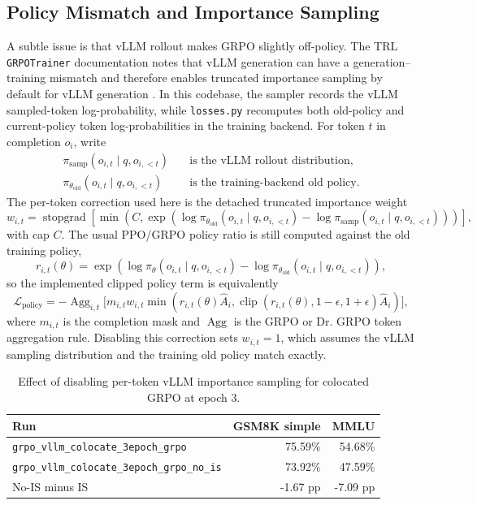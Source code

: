 \documentclass[11pt]{article}
\begin{document}
\subsection{Policy Mismatch and Importance Sampling}
A subtle issue is that vLLM rollout makes GRPO slightly off-policy. The TRL \texttt{GRPOTrainer} documentation notes that vLLM generation can have a generation--training mismatch and therefore enables truncated importance sampling by default for vLLM generation \cite{trl_grpo_trainer_doc}. In this codebase, the sampler records the vLLM sampled-token log-probability, while \texttt{losses.py} recomputes both old-policy and current-policy token log-probabilities in the training backend. For token $t$ in completion $o_i$, write
\[
\begin{aligned}
\pi_{\mathrm{samp}}(o_{i,t}\mid q,o_{i,<t})
&\quad\text{is the vLLM rollout distribution,} \\
\pi_{\theta_{\mathrm{old}}}(o_{i,t}\mid q,o_{i,<t})
&\quad\text{is the training-backend old policy.}
\end{aligned}
\]
The per-token correction used here is the detached truncated importance weight
\[
w_{i,t}
=
\operatorname{stopgrad}\!\left[
\min\!\left(
C,
\exp\!\left(
\log \pi_{\theta_{\mathrm{old}}}(o_{i,t}\mid q,o_{i,<t})
-
\log \pi_{\mathrm{samp}}(o_{i,t}\mid q,o_{i,<t})
\right)
\right)
\right],
\]
with cap $C$. The usual PPO/GRPO policy ratio is still computed against the old training policy,
\[
r_{i,t}(\theta)
=
\exp\!\left(
\log \pi_{\theta}(o_{i,t}\mid q,o_{i,<t})
-
\log \pi_{\theta_{\mathrm{old}}}(o_{i,t}\mid q,o_{i,<t})
\right),
\]
so the implemented clipped policy term is equivalently
\[
\mathcal{L}_{\mathrm{policy}}
=
-\operatorname{Agg}_{i,t}\!\bigg[
 m_{i,t} w_{i,t}
 \min\!\left(
 r_{i,t}(\theta)\hat{A}_i,
 \operatorname{clip}(r_{i,t}(\theta),1-\epsilon,1+\epsilon)\hat{A}_i
 \right)
\bigg],
\]
where $m_{i,t}$ is the completion mask and \(\operatorname{Agg}\) is the GRPO or Dr. GRPO token aggregation rule. Disabling this correction sets $w_{i,t}=1$, which assumes the vLLM sampling distribution and the training old policy match exactly.

\begin{table}[t]
\centering
\caption{Effect of disabling per-token vLLM importance sampling for colocated GRPO at epoch 3.}
\label{tab:vllm-is-ablation}
\begin{tabular}{l r r}
\toprule
Run & GSM8K simple & MMLU \\
\midrule
\texttt{grpo\_vllm\_colocate\_3epoch\_grpo} & 75.59\% & 54.68\% \\
\texttt{grpo\_vllm\_colocate\_3epoch\_grpo\_no\_is} & 73.92\% & 47.59\% \\
\midrule
No-IS minus IS & -1.67 pp & -7.09 pp \\
\bottomrule
\end{tabular}
\end{table}
\end{document}
